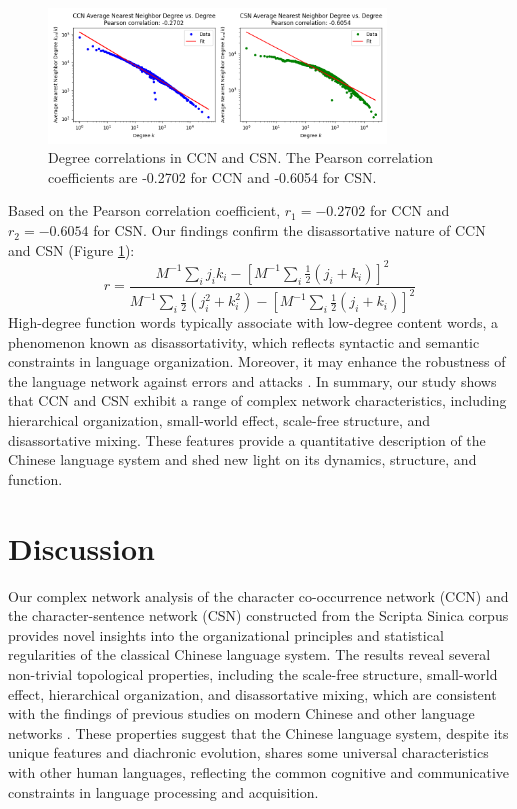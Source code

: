 \documentclass[11pt]{article}
\begin{document}
\begin{figure}[htbp]
    \centering
    \includegraphics[width=0.8\textwidth]{../analysis/knn/knn.png}
    \caption{Degree correlations in CCN and CSN. The Pearson correlation coefficients are -0.2702 for CCN and -0.6054 for CSN.}
    \label{fig:degree_correlation}
    \end{figure}
    Based on the Pearson correlation coefficient, $r_1=-0.2702$ for CCN and $r_2=-0.6054$ for CSN. Our findings confirm the disassortative nature of CCN and CSN (Figure \ref{fig:degree_correlation}):
    \begin{equation}
    r = \frac{M^{-1}\sum_{i}j_ik_i-[M^{-1}\sum_{i}\frac{1}{2}(j_i+k_i)]^2}{M^{-1}\sum_{i}\frac{1}{2}(j_i^2+k_i^2)-[M^{-1}\sum_{i}\frac{1}{2}(j_i+k_i)]^2}
    \end{equation}
    High-degree function words typically associate with low-degree content words, a phenomenon known as disassortativity, which reflects syntactic and semantic constraints in language organization. Moreover, it may enhance the robustness of the language network against errors and attacks \cite{Newman, 2002}.
    In summary, our study shows that CCN and CSN exhibit a range of complex network characteristics, including hierarchical organization, small-world effect, scale-free structure, and disassortative mixing. These features provide a quantitative description of the Chinese language system and shed new light on its dynamics, structure, and function. 
\section{Discussion}
Our complex network analysis of the character co-occurrence network (CCN) and the character-sentence network (CSN) constructed from the Scripta Sinica corpus provides novel insights into the organizational principles and statistical regularities of the classical Chinese language system. The results reveal several non-trivial topological properties, including the scale-free structure, small-world effect, hierarchical organization, and disassortative mixing, which are consistent with the findings of previous studies on modern Chinese and other language networks \cite{FerreriCancho2001,Sole2010,Cong2014}. These properties suggest that the Chinese language system, despite its unique features and diachronic evolution, shares some universal characteristics with other human languages, reflecting the common cognitive and communicative constraints in language processing and acquisition.
\end{document}
